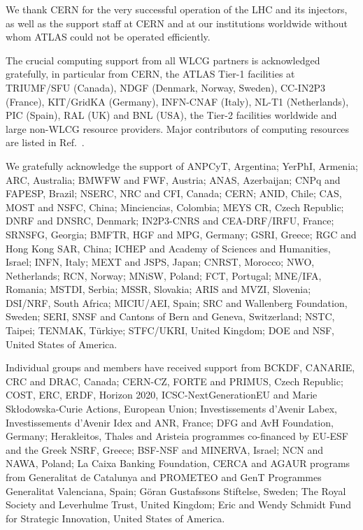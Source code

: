 \documentclass[PAPER, atlasdraft=false, USenglish, cernpreprint]{atlasdoc}
\begin{document}
We thank CERN for the very successful operation of the LHC and its injectors, as well as the support staff at
CERN and at our institutions worldwide without whom ATLAS could not be operated efficiently.
 
The crucial computing support from all WLCG partners is acknowledged gratefully, in particular from CERN, the ATLAS Tier-1 facilities at TRIUMF/SFU (Canada), NDGF (Denmark, Norway, Sweden), CC-IN2P3 (France), KIT/GridKA (Germany), INFN-CNAF (Italy), NL-T1 (Netherlands), PIC (Spain), RAL (UK) and BNL (USA), the Tier-2 facilities worldwide and large non-WLCG resource providers. Major contributors of computing resources are listed in Ref.~\cite{ATL-SOFT-PUB-2026-001}.
 
We gratefully acknowledge the support of ANPCyT, Argentina; YerPhI, Armenia; ARC, Australia; BMWFW and FWF, Austria; ANAS, Azerbaijan; CNPq and FAPESP, Brazil; NSERC, NRC and CFI, Canada; CERN; ANID, Chile; CAS, MOST and NSFC, China; Minciencias, Colombia; MEYS CR, Czech Republic; DNRF and DNSRC, Denmark; IN2P3-CNRS and CEA-DRF/IRFU, France; SRNSFG, Georgia; BMFTR, HGF and MPG, Germany; GSRI, Greece; RGC and Hong Kong SAR, China; ICHEP and Academy of Sciences and Humanities, Israel; INFN, Italy; MEXT and JSPS, Japan; CNRST, Morocco; NWO, Netherlands; RCN, Norway; MNiSW, Poland; FCT, Portugal; MNE/IFA, Romania; MSTDI, Serbia; MSSR, Slovakia; ARIS and MVZI, Slovenia; DSI/NRF, South Africa; MICIU/AEI, Spain; SRC and Wallenberg Foundation, Sweden; SERI, SNSF and Cantons of Bern and Geneva, Switzerland; NSTC, Taipei; TENMAK, T\"urkiye; STFC/UKRI, United Kingdom; DOE and NSF, United States of America.
 
Individual groups and members have received support from BCKDF, CANARIE, CRC and DRAC, Canada; CERN-CZ, FORTE and PRIMUS, Czech Republic; COST, ERC, ERDF, Horizon 2020, ICSC-NextGenerationEU and Marie Sk{\l}odowska-Curie Actions, European Union; Investissements d'Avenir Labex, Investissements d'Avenir Idex and ANR, France; DFG and AvH Foundation, Germany; Herakleitos, Thales and Aristeia programmes co-financed by EU-ESF and the Greek NSRF, Greece; BSF-NSF and MINERVA, Israel; NCN and NAWA, Poland; La Caixa Banking Foundation, CERCA and AGAUR programs from Generalitat de Catalunya and PROMETEO and GenT Programmes Generalitat Valenciana, Spain; G\"{o}ran Gustafssons Stiftelse, Sweden; The Royal Society and Leverhulme Trust, United Kingdom; Eric and Wendy Schmidt Fund for Strategic Innovation, United States of America.
 
\end{document}
